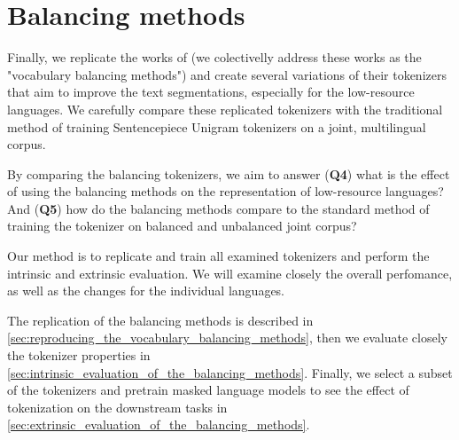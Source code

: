 \chapter{Balancing methods}
\label{chap:experiment_3_balancing}



Finally, we replicate the works of \citet{chung_improving_2020,zheng_allocating_2021,liang_xlm-v_2023} (we colectivelly address these works as the "vocabulary balancing methods") and create several variations of their tokenizers that aim to improve the text segmentations, especially for the low-resource languages. We carefully compare these replicated tokenizers with the traditional method of training Sentencepiece Unigram tokenizers on a joint, multilingual corpus.

By comparing the balancing tokenizers, we aim to answer (\textbf{Q4}) what is the effect of using the balancing methods on the representation of low-resource languages? And (\textbf{Q5}) how do the balancing methods compare to the standard method of training the tokenizer on balanced and unbalanced joint corpus?

Our method is to replicate and train all examined tokenizers and perform the intrinsic and extrinsic evaluation. We will examine closely the overall perfomance, as well as the changes for the individual languages.

The replication of the balancing methods is described in \autoref{sec:reproducing_the_vocabulary_balancing_methods}, then we evaluate closely the tokenizer properties in \autoref{sec:intrinsic_evaluation_of_the_balancing_methods}. Finally, we select a subset of the tokenizers and pretrain masked language models to see the effect of tokenization on the downstream tasks in \autoref{sec:extrinsic_evaluation_of_the_balancing_methods}.




